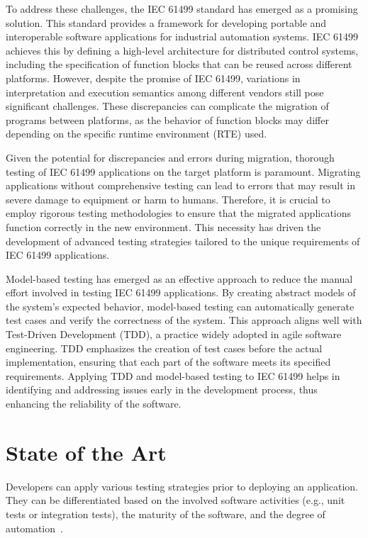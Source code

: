 To address these challenges, the IEC 61499 standard has emerged as a promising solution. This standard provides a framework for developing portable and interoperable software applications for industrial automation systems. IEC 61499 achieves this by defining a high-level architecture for distributed control systems, including the specification of function blocks that can be reused across different platforms. However, despite the promise of IEC 61499, variations in interpretation and execution semantics among different vendors still pose significant challenges. These discrepancies can complicate the migration of programs between platforms, as the behavior of function blocks may differ depending on the specific runtime environment (RTE) used.

Given the potential for discrepancies and errors during migration, thorough testing of IEC 61499 applications on the target platform is paramount. Migrating applications without comprehensive testing can lead to errors that may result in severe damage to equipment or harm to humans. Therefore, it is crucial to employ rigorous testing methodologies to ensure that the migrated applications function correctly in the new environment. This necessity has driven the development of advanced testing strategies tailored to the unique requirements of IEC 61499 applications.

Model-based testing has emerged as an effective approach to reduce the manual effort involved in testing IEC 61499 applications. By creating abstract models of the system's expected behavior, model-based testing can automatically generate test cases and verify the correctness of the system. This approach aligns well with Test-Driven Development (TDD), a practice widely adopted in agile software engineering. TDD emphasizes the creation of test cases before the actual implementation, ensuring that each part of the software meets its specified requirements. Applying TDD and model-based testing to IEC 61499 helps in identifying and addressing issues early in the development process, thus enhancing the reliability of the software.


\section{State of the Art}
\label{sec::sota}



Developers can apply various testing strategies prior to deploying an application. They can be differentiated based on the involved software activities (e.g., unit tests or integration tests), the maturity of the software, and the degree of automation~\cite{softwareTesting}. 

